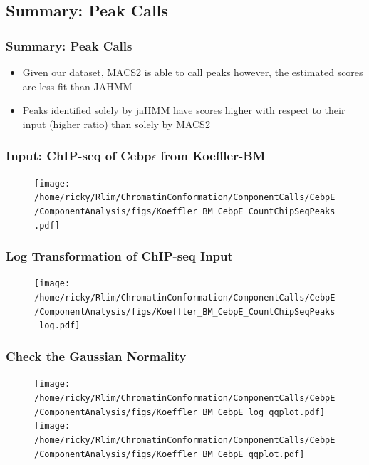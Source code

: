 \documentclass[notes]{beamer}
\begin{document}
\subsection{Summary: Peak Calls}
\begin{frame}
    \frametitle{Summary: Peak Calls}
    \begin{itemize}[<+->]
        \item Given our dataset, MACS2 is able to call peaks however, the estimated scores are less fit than JAHMM 
        \item Peaks identified solely by jaHMM have scores higher with respect to their input (higher ratio) than solely by MACS2  
    \end{itemize}
\end{frame}

\begin{frame}

\end{frame}

\begin{frame}
    \frametitle{Input: ChIP-seq of Cebp$\epsilon$ from Koeffler-BM}
    \begin{figure}
        \texttt{[image: /home/ricky/Rlim/ChromatinConformation/ComponentCalls/CebpE/ComponentAnalysis/figs/Koeffler\_BM\_CebpE\_CountChipSeqPeaks.pdf]}
    \end{figure}
\end{frame}

\begin{frame}                                                                                                                        
    \frametitle{Log Transformation of ChIP-seq Input}
    \begin{figure}
        \texttt{[image: /home/ricky/Rlim/ChromatinConformation/ComponentCalls/CebpE/ComponentAnalysis/figs/Koeffler\_BM\_CebpE\_CountChipSeqPeaks\_log.pdf]}
    \end{figure}
\end{frame}

\begin{frame}                                                                                                                        
    \frametitle{Check the Gaussian Normality}
    \begin{figure}
        \texttt{[image: /home/ricky/Rlim/ChromatinConformation/ComponentCalls/CebpE/ComponentAnalysis/figs/Koeffler\_BM\_CebpE\_log\_qqplot.pdf]}
        \texttt{[image: /home/ricky/Rlim/ChromatinConformation/ComponentCalls/CebpE/ComponentAnalysis/figs/Koeffler\_BM\_CebpE\_qqplot.pdf]}
    \end{figure}
\end{frame}
\end{document}
